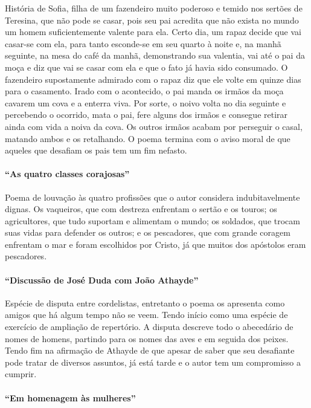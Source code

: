 História de Sofia, filha de um fazendeiro muito poderoso e temido nos
sertões de Teresina, que não pode se casar, pois seu pai acredita que
não exista no mundo um homem suficientemente valente para ela. Certo
dia, um rapaz decide que vai casar-se com ela, para tanto esconde-se em
seu quarto à noite e, na manhã seguinte, na mesa do café da manhã,
demonstrando sua valentia, vai até o pai da moça e diz que vai se casar
com ela e que o fato já havia sido consumado. O fazendeiro
supostamente admirado com o rapaz diz que ele volte em quinze dias para o
casamento. Irado com o acontecido, o pai manda os irmãos da moça cavarem
um cova e a enterra viva. Por sorte, o noivo volta no dia seguinte e
percebendo o ocorrido, mata o pai, fere alguns dos irmãos e consegue
retirar ainda com vida a noiva da cova. Os outros irmãos acabam por
perseguir o casal, matando ambos e os retalhando. O poema termina com o
aviso moral de que aqueles que desafiam os pais tem um fim nefasto.

\paragraph{``As quatro classes corajosas''}

Poema de louvação às quatro profissões que o autor considera
indubitavelmente dignas. Os vaqueiros, que com destreza enfrentam o
sertão e os touros; os agricultores, que tudo suportam e alimentam o
mundo; os soldados, que trocam suas vidas para defender os outros; e os
pescadores, que com grande coragem enfrentam o mar e foram escolhidos
por Cristo, já que muitos dos apóstolos eram pescadores. 

\paragraph{``Discussão de José Duda com João
Athayde''}

Espécie de disputa entre cordelistas, entretanto o poema os apresenta
como amigos que há algum tempo não se veem. Tendo início como uma
espécie de exercício de ampliação de repertório. A disputa descreve
todo o abecedário de nomes de homens, partindo para os nomes das aves e
em seguida dos peixes. Tendo fim na afirmação de Athayde de que apesar
de saber que seu desafiante pode tratar de diversos assuntos, já está
tarde e o autor tem um compromisso a cumprir.

\paragraph{``Em homenagem às mulheres''}

